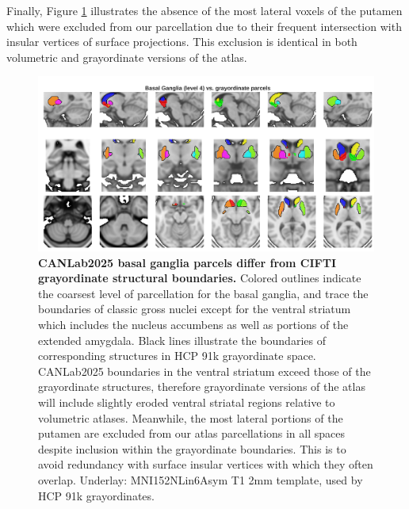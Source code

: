 \documentclass[10pt,letterpaper]{article}
\begin{document}
Finally, Figure \ref{bg-vs-cifti-figure} illustrates the absence of the most lateral voxels of the putamen which were excluded from our parcellation due to their frequent intersection with insular vertices of surface projections. This exclusion is identical in both volumetric and grayordinate versions of the atlas.

\begin{figure}[t!]
\centering
\includegraphics[width=\linewidth]{images/bg_vs_cifti.png}
\caption{
{\bf
CANLab2025 basal ganglia parcels differ from CIFTI grayordinate structural boundaries.} 
Colored outlines indicate the coarsest level of parcellation for the basal ganglia, and trace the boundaries of classic gross nuclei except for the ventral striatum which includes the nucleus accumbens as well as portions of the extended amygdala. Black lines illustrate the boundaries of corresponding structures in HCP 91k grayordinate space. CANLab2025 boundaries in the ventral striatum exceed those of the grayordinate structures, therefore grayordinate versions of the atlas will include slightly eroded ventral striatal regions relative to volumetric atlases. Meanwhile, the most lateral portions of the putamen are excluded from our atlas parcellations in all spaces despite inclusion within the grayordinate boundaries. This is to avoid redundancy with surface insular vertices with which they often overlap. Underlay: MNI152NLin6Asym T1 2mm template, used by HCP 91k grayordinates.}
\label{bg-vs-cifti-figure}
\end{figure}
\end{document}
